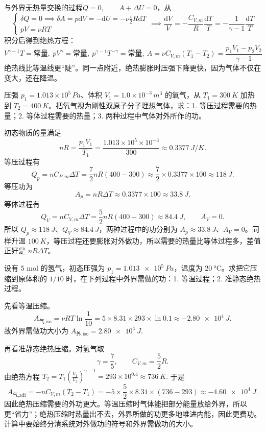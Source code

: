 \begin{definition}[绝热过程]
    与外界无热量交换的过程\(Q=0,\qquad A+\Delta U=0\)，从
\[\begin{cases}\delta Q=0\implies \delta A=p\mathrm dV=-\mathrm dU=-\nu \frac{i}{2}R\mathrm dT\\
pV=\nu RT\end{cases}\implies \frac{\mathrm dV}{V}=-\frac{C_{V,m}}{R}\frac{\mathrm dT}{T}
=-\frac{1}{\gamma-1}\frac{\mathrm dT}{T}\]积分后得到绝热方程：
\[
V^{\gamma-1}T=\text{常量},~ pV^\gamma=\text{常量},~p^{\gamma-1}T^{-\gamma}=\text{常量},~A=\nu C_{V,m}(T_1-T_2)=\frac{p_1V_1-p_2V_2}{\gamma-1}
\]
绝热线比等温线更“陡”。同一点附近，绝热膨胀时压强下降更快，因为气体不仅在变大，还在降温。
\end{definition}





\begin{exercise}
压强 \(p_1=1.013\times10^5\,\si{Pa}\)、体积 \(V_1=1.0\times10^{-3}\,\si{m^3}\) 的氧气，从 \(T_1=\SI{300}{K}\) 加热到 \(T_2=\SI{400}{K}\)。把氧气视为刚性双原子分子理想气体，求：1. 等压过程需要的热量；2. 等体过程需要的热量；3. 两种过程中气体对外所作的功。
\end{exercise}

\begin{solution}
初态物质的量满足
 \[nR=\frac{p_1V_1}{T_1} =\frac{1.013\times10^5\times10^{-3}}{300} \approx \SI{0.3377}{J/K}.\]
等压过程有
 \[Q_p=nC_{P,m}\Delta T =\frac72 nR(400-300) \approx \frac72\times0.3377\times100 \approx \SI{118}{J}.\]
等压功为
 \[A_p=nR\Delta T \approx 0.3377\times100 \approx \SI{33.8}{J}.\]
等体过程有
 \[Q_V=nC_{V,m}\Delta T =\frac52 nR(400-300) \approx \SI{84.4}{J}, \qquad A_V=0.\]
所以 \(Q_p\approx\SI{118}{J}\)、\(Q_V\approx\SI{84.4}{J}\)，两种过程中的功分别为 \(A_p\approx\SI{33.8}{J}\)、\(A_V=0\)。同样升温 \(\SI{100}{K}\)，等压过程还要膨胀对外做功，所以需要的热量比等体过程多，差值正好是 \(nR\Delta T\)。
\end{solution}


\begin{exercise}
设有 \(5\) mol 的氢气，初态压强为 \(p_1=\SI{1.013e5}{Pa}\)，温度为 \(\SI{20}{\celsius}\)。求把它压缩到原体积的 \(1/10\) 时，在下列过程中外界需做的功：1. 等温过程；2. 准静态绝热过程。
\end{exercise}

\begin{solution}
先看等温压缩。
 \[A_{\text{气,iso}}=\nu RT\ln\frac{1}{10} =5\times 8.31\times 293\times \ln 0.1 \approx \SI{-2.80e4}{J}.\]
故外界需做功大小为
 \(A_{\text{外,iso}}=\SI{2.80e4}{J}.\) 

再看准静态绝热压缩。对氢气取
\[
\gamma=\frac75,\qquad C_{V,m}=\frac52 R.
\]
由绝热方程
 \(T_2=T_1\left(\frac{V_1}{V_2}\right)^{\gamma-1} =293\times 10^{0.4}\approx \SI{736}{K}.\) 
于是
\[
A_{\text{气,adi}}=-nC_{V,m}(T_2-T_1)=-5\times \frac52\times 8.31\times (736-293)\approx \SI{-4.60e4}{J}.
\]
因此绝热压缩需要的外功更大。等温压缩时气体能把部分能量放给外界，所以更“省力”；绝热压缩时热量出不去，外界所做的功更多地堆进内能，因此更费功。计算中要始终分清系统对外做功的符号和外界需做功的大小。
\end{solution}
